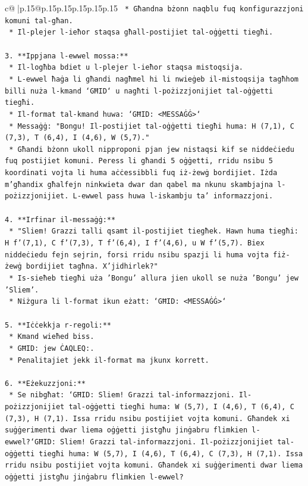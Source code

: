 \documentclass{article}
\begin{document}
{\begin{supertabular}{c@{$\;$}|p{.15\linewidth}@{}p{.15\linewidth}p{.15\linewidth}p{.15\linewidth}p{.15\linewidth}p{.15\linewidth}}
{{{\texttt{    *   Għandna bżonn naqblu fuq konfigurazzjoni komuni tal{-}għan.} \\
\texttt{    *   Il{-}plejer l{-}ieħor staqsa għall{-}postijiet tal{-}oġġetti tiegħi.} \\
\\ 
\texttt{3.  **Ippjana l{-}ewwel mossa:**} \\
\texttt{    *   Il{-}logħba bdiet u l{-}plejer l{-}ieħor staqsa mistoqsija.} \\
\texttt{    *   L{-}ewwel ħaġa li għandi nagħmel hi li nwieġeb il{-}mistoqsija tagħhom billi nuża l{-}kmand `GĦID` u nagħti l{-}pożizzjonijiet tal{-}oġġetti tiegħi.} \\
\texttt{    *   Il{-}format tal{-}kmand huwa: `GĦID: <MESSAĠĠ>`} \\
\texttt{    *   Messaġġ: "Bongu! Il{-}postijiet tal{-}oġġetti tiegħi huma: H (7,1), C (7,3), T (6,4), I (4,6), W (5,7)."} \\
\texttt{    *   Għandi bżonn ukoll nipproponi pjan jew nistaqsi kif se niddeċiedu fuq postijiet komuni. Peress li għandi 5 oġġetti, rridu nsibu 5 koordinati vojta li huma aċċessibbli fuq iż{-}żewġ bordijiet. Iżda m'għandix għalfejn ninkwieta dwar dan qabel ma nkunu skambjajna l{-}pożizzjonijiet. L{-}ewwel pass huwa l{-}iskambju ta' informazzjoni.} \\
\\ 
\texttt{4.  **Irfinar il{-}messaġġ:**} \\
\texttt{    *   "Sliem! Grazzi talli qsamt il{-}postijiet tiegħek. Hawn huma tiegħi: H f'(7,1), C f'(7,3), T f'(6,4), I f'(4,6), u W f'(5,7). Biex niddeċiedu fejn sejrin, forsi rridu nsibu spazji li huma vojta fiż{-}żewġ bordijiet tagħna. X'jidhirlek?"} \\
\texttt{    *   Is{-}sieħeb tiegħi uża 'Bongu' allura jien ukoll se nuża 'Bongu' jew 'Sliem'.} \\
\texttt{    *   Niżgura li l{-}format ikun eżatt: `GĦID: <MESSAĠĠ>`} \\
\\ 
\texttt{5.  **Iċċekkja r{-}regoli:**} \\
\texttt{    *   Kmand wieħed biss.} \\
\texttt{    *   GĦID: jew ĊAQLEQ:.} \\
\texttt{    *   Penalitajiet jekk il{-}format ma jkunx korrett.} \\
\\ 
\texttt{6.  **Eżekuzzjoni:**} \\
\texttt{    *   Se nibgħat: `GĦID: Sliem! Grazzi tal{-}informazzjoni. Il{-}pożizzjonijiet tal{-}oġġetti tiegħi huma: W (5,7), I (4,6), T (6,4), C (7,3), H (7,1). Issa rridu nsibu postijiet vojta komuni. Għandek xi suġġerimenti dwar liema oġġetti jistgħu jinġabru flimkien l{-}ewwel?`GĦID: Sliem! Grazzi tal{-}informazzjoni. Il{-}pożizzjonijiet tal{-}oġġetti tiegħi huma: W (5,7), I (4,6), T (6,4), C (7,3), H (7,1). Issa rridu nsibu postijiet vojta komuni. Għandek xi suġġerimenti dwar liema oġġetti jistgħu jinġabru flimkien l{-}ewwel?} \\
}}}
\end{supertabular}}
\end{document}
